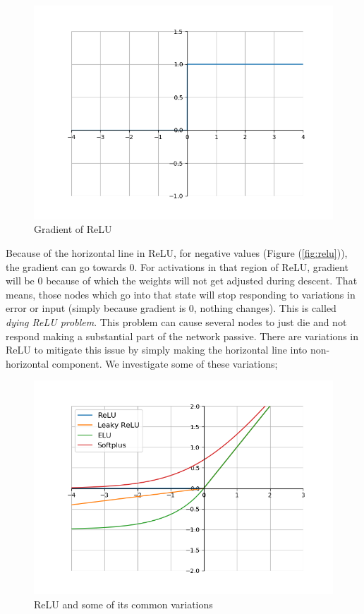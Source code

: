 \documentclass[12pt]{report}
\numberwithin{equation}{section}
\begin{document}
\begin{figure}[htb!]
\centering 
\includegraphics[scale=0.9]{png/relu_prime.png} 
\caption{Gradient of ReLU}
\label{fig:relu_prime}
\end{figure}
Because of the horizontal line in ReLU, for negative values (Figure (\ref{fig:relu})), the gradient can go towards $0$. For activations in that region of ReLU, gradient will be $0$ because of which the weights will not get adjusted during descent. That means, those nodes which go into that state will stop responding to variations in error or input (simply because gradient is $0$, nothing changes). This is called  \textit{dying ReLU problem}. This problem can cause several nodes to just die and not respond making a substantial part of the network passive. There are variations in ReLU to mitigate this issue by simply making the horizontal line into non-horizontal component. We investigate some of these variations;
\begin{figure}[htb!]
\centering 
\includegraphics[scale=0.9]{png/compare.png} 
\caption{ReLU and some of its common variations}
\label{fig:compare}
\end{figure}
\end{document}
